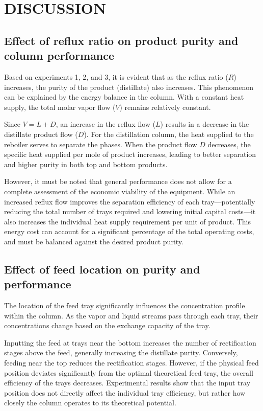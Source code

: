 \section{DISCUSSION}

\subsection{Effect of reflux ratio on product purity and column performance}

Based on experiments 1, 2, and 3, it is evident that as the reflux ratio ($R$) increases, the purity of the product (distillate) also increases. This phenomenon can be explained by the energy balance in the column. With a constant heat supply, the total molar vapor flow ($V$) remains relatively constant.

Since $V = L + D$, an increase in the reflux flow ($L$) results in a decrease in the distillate product flow ($D$). For the distillation column, the heat supplied to the reboiler serves to separate the phases. When the product flow $D$ decreases, the specific heat supplied per mole of product increases, leading to better separation and higher purity in both top and bottom products.

However, it must be noted that general performance does not allow for a complete assessment of the economic viability of the equipment. While an increased reflux flow improves the separation efficiency of each tray—potentially reducing the total number of trays required and lowering initial capital costs—it also increases the individual heat supply requirement per unit of product. This energy cost can account for a significant percentage of the total operating costs, and must be balanced against the desired product purity.

\subsection{Effect of feed location on purity and performance}

The location of the feed tray significantly influences the concentration profile within the column. As the vapor and liquid streams pass through each tray, their concentrations change based on the exchange capacity of the tray.

Inputting the feed at trays near the bottom increases the number of rectification stages above the feed, generally increasing the distillate purity. Conversely, feeding near the top reduces the rectification stages. However, if the physical feed position deviates significantly from the optimal theoretical feed tray, the overall efficiency of the trays decreases. Experimental results show that the input tray position does not directly affect the individual tray efficiency, but rather how closely the column operates to its theoretical potential.

